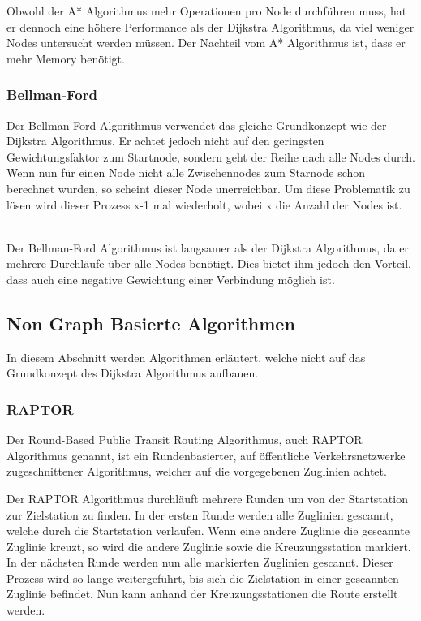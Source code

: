 Obwohl der A* Algorithmus mehr Operationen pro Node durchführen muss, hat er dennoch eine höhere Performance als der Dijkstra Algorithmus, da viel weniger Nodes untersucht werden müssen. Der Nachteil vom A* Algorithmus ist, dass er mehr Memory benötigt. ~\cite{dij_a}

 

\subsubsection{Bellman-Ford}
\label{sec:Bellman-Ford}
Der Bellman-Ford Algorithmus verwendet das gleiche Grundkonzept wie der Dijkstra Algorithmus. Er achtet jedoch nicht auf den geringsten Gewichtungsfaktor zum Startnode, sondern geht der Reihe nach alle Nodes durch. Wenn nun für einen Node nicht alle Zwischennodes zum Starnode schon berechnet wurden, so scheint dieser Node unerreichbar. Um diese Problematik zu lösen wird dieser Prozess x-1 mal wiederholt, wobei x die Anzahl der Nodes ist. ~\cite{dij_bell} ~\cite{bell}

Der Bellman-Ford Algorithmus ist langsamer als der Dijkstra Algorithmus, da er mehrere Durchläufe über alle Nodes benötigt. Dies bietet ihm jedoch den Vorteil, dass auch eine negative Gewichtung einer Verbindung möglich ist.

\subsection{Non Graph Basierte Algorithmen}
\label{sec:Non Graph Basierte Algorithmen}
In diesem Abschnitt werden Algorithmen erläutert, welche nicht auf das Grundkonzept des Dijkstra Algorithmus aufbauen.

\subsubsection{RAPTOR}
\label{sec:RAPTOR}
Der Round-Based Public Transit Routing Algorithmus, auch RAPTOR Algorithmus genannt, ist ein Rundenbasierter, auf öffentliche Verkehrsnetzwerke zugeschnittener Algorithmus, welcher auf die vorgegebenen Zuglinien achtet.

Der RAPTOR Algorithmus durchläuft mehrere Runden um von der Startstation zur Zielstation zu finden. In der ersten Runde werden alle Zuglinien gescannt, welche durch die Startstation verlaufen. Wenn eine andere Zuglinie die gescannte Zuglinie kreuzt, so wird die andere Zuglinie sowie die Kreuzungsstation markiert. In der nächsten Runde werden nun alle markierten Zuglinien gescannt. Dieser Prozess wird so lange weitergeführt, bis sich die Zielstation in einer gescannten Zuglinie befindet. Nun kann anhand der Kreuzungsstationen die Route erstellt werden.

